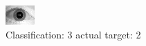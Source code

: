 \begin{figure}[h!]
\begin{center}
\includegraphics[width=0.60\columnwidth]{figures/ID1777_class_3_target_2.png}
\end{center}
\caption{ Classification: 3 actual target: 2}
\label{fig:ID1777_class_3_target_2}
\end{figure}
